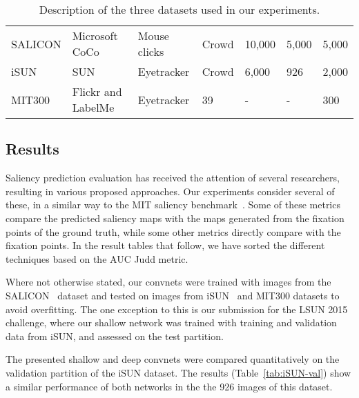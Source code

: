 \documentclass[10pt,twocolumn,letterpaper]{article}
\begin{document}
\begin{table*}
\begin{center}
\begin{tabular}{lllllll}
\midrule
SALICON	\cite{jiang2015salicon} & Microsoft CoCo \cite{lin2014microsoft} & Mouse clicks	& Crowd & 10,000 	& 5,000	& 5,000 \\
iSUN 	\cite{xu2015turkergaze} & SUN \cite{xiao2010sun} & Eyetracker	& Crowd & 6,000 	& 926	& 2,000 \\
MIT300 \cite{mit-saliency-benchmark}	& Flickr and LabelMe \cite{russell2008labelme} 	& Eyetracker	& 39 & - & -	& 300 \\
\bottomrule
\end{tabular}
\end{center}
\caption{Description of the three datasets used in our experiments.}
\label{tab:datasets}
\end{table*}\subsection{Results}

Saliency prediction evaluation has received the attention of several researchers, resulting in various proposed approaches.
Our experiments consider several of these, in a similar way to the MIT saliency benchmark~\cite{Judd_2012}. %
Some of these metrics compare the predicted saliency maps with the maps generated from the fixation points of the ground truth, while some other metrics directly compare with the fixation points.
In the result tables that follow, we have sorted the different techniques based on the AUC Judd metric.

Where not otherwise stated, our convnets were trained with images from the SALICON~\cite{jiang2015salicon} dataset and tested on images from iSUN~\cite{xu2015turkergaze} and MIT300 datasets to avoid overfitting.
The one exception to this is our submission for the LSUN 2015 challenge, where our shallow network was trained with training and validation data from iSUN, and assessed on the test partition.

The presented shallow and deep convnets were compared quantitatively on the validation partition of the iSUN dataset.
The results (Table~\ref{tab:iSUN-val}) show a similar performance of both networks in the the 926 images of this dataset.
\end{document}
